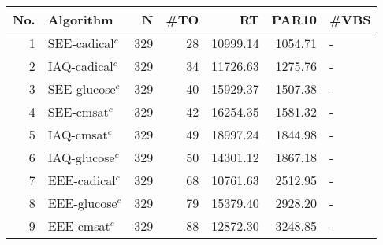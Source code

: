 \begin{tabular}{rlrrrrl}
\toprule
No. & Algorithm & N & #TO & RT & PAR10 & #VBS \\
\midrule
1 & SEE-cadical$^c$ & 329 & 28 & 10999.14 & 1054.71 & - \\
2 & IAQ-cadical$^c$ & 329 & 34 & 11726.63 & 1275.76 & - \\
3 & SEE-glucose$^c$ & 329 & 40 & 15929.37 & 1507.38 & - \\
4 & SEE-cmsat$^c$ & 329 & 42 & 16254.35 & 1581.32 & - \\
5 & IAQ-cmsat$^c$ & 329 & 49 & 18997.24 & 1844.98 & - \\
6 & IAQ-glucose$^c$ & 329 & 50 & 14301.12 & 1867.18 & - \\
7 & EEE-cadical$^c$ & 329 & 68 & 10761.63 & 2512.95 & - \\
8 & EEE-glucose$^c$ & 329 & 79 & 15379.40 & 2928.20 & - \\
9 & EEE-cmsat$^c$ & 329 & 88 & 12872.30 & 3248.85 & - \\
\bottomrule
\end{tabular}
